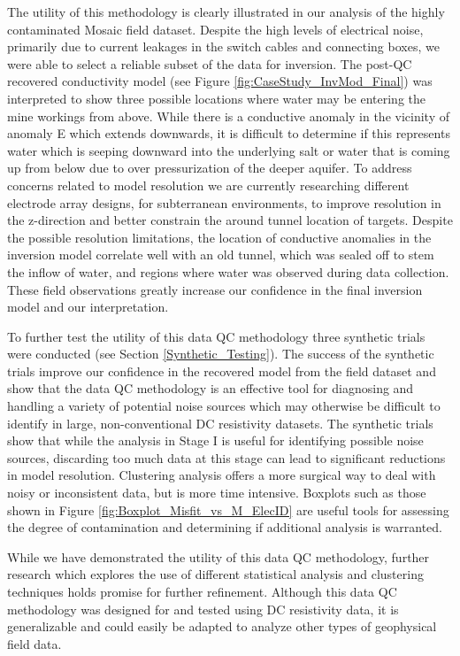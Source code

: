 \documentclass[final,authoryear,5p,times,twocolumn]{elsarticle}
\begin{document}
The utility of this methodology is clearly illustrated in our analysis of the highly contaminated Mosaic field dataset. Despite the high levels of electrical noise, primarily due to current leakages in the switch cables and connecting boxes, we were able to select a reliable subset of the data for inversion. The post-QC recovered conductivity model (see Figure \ref{fig:CaseStudy_InvMod_Final}) was interpreted to show three possible locations where water may be entering the mine workings from above. While there is a conductive anomaly in the vicinity of anomaly E which extends downwards, it is difficult to determine if this represents water which is seeping downward into the underlying salt or water that is coming up from below due to over pressurization of the deeper aquifer. To address concerns related to model resolution we are currently researching different electrode array designs, for subterranean environments, to improve resolution in the z-direction and better constrain the around tunnel location of targets. Despite the possible resolution limitations, the location of conductive anomalies in the inversion model correlate well with an old tunnel, which was sealed off to stem the inflow of water, and regions where water was observed during data collection. These field observations greatly increase our confidence in the final inversion model and our interpretation.

To further test the utility of this data QC methodology three synthetic trials were conducted (see Section \ref{Synthetic_Testing}). The success of the synthetic trials improve our confidence in the recovered model from the field dataset and show that the data QC methodology is an effective tool for diagnosing and handling a variety of potential noise sources which may otherwise be difficult to identify in large, non-conventional DC resistivity datasets. The synthetic trials show that while the analysis in Stage I is useful for identifying possible noise sources, discarding too much data at this stage can lead to significant reductions in model resolution. Clustering analysis offers a more surgical way to deal with noisy or inconsistent data, but is more time intensive. Boxplots such as those shown in Figure \ref{fig:Boxplot_Misfit_vs_M_ElecID} are useful tools for assessing the degree of contamination and determining if additional analysis is warranted. 

While we have demonstrated the utility of this data QC methodology, further research which explores the use of different statistical analysis and clustering techniques holds promise for further refinement. Although this data QC methodology was designed for and tested using DC resistivity data, it is generalizable and could easily be adapted to analyze other types of geophysical field data.   
\end{document}
